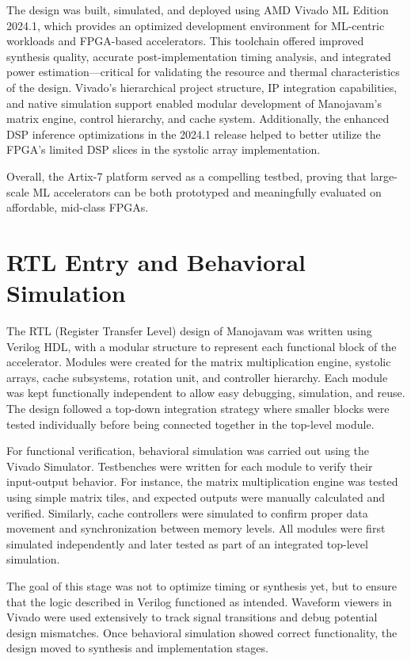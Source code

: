The design was built, simulated, and deployed using AMD Vivado ML Edition 2024.1, which provides an optimized development environment for ML-centric workloads and FPGA-based accelerators. This toolchain offered improved synthesis quality, accurate post-implementation timing analysis, and integrated power estimation—critical for validating the resource and thermal characteristics of the design. Vivado’s hierarchical project structure, IP integration capabilities, and native simulation support enabled modular development of Manojavam’s matrix engine, control hierarchy, and cache system. Additionally, the enhanced DSP inference optimizations in the 2024.1 release helped to better utilize the FPGA’s limited DSP slices in the systolic array implementation.

Overall, the Artix-7 platform served as a compelling testbed, proving that large-scale ML accelerators can be both prototyped and meaningfully evaluated on affordable, mid-class FPGAs.

\section{RTL Entry and Behavioral Simulation}
The RTL (Register Transfer Level) design of Manojavam was written using Verilog HDL, with a modular structure to represent each functional block of the accelerator. Modules were created for the matrix multiplication engine, systolic arrays, cache subsystems, rotation unit, and controller hierarchy. Each module was kept functionally independent to allow easy debugging, simulation, and reuse. The design followed a top-down integration strategy where smaller blocks were tested individually before being connected together in the top-level module.

For functional verification, behavioral simulation was carried out using the Vivado Simulator. Testbenches were written for each module to verify their input-output behavior. For instance, the matrix multiplication engine was tested using simple matrix tiles, and expected outputs were manually calculated and verified. Similarly, cache controllers were simulated to confirm proper data movement and synchronization between memory levels. All modules were first simulated independently and later tested as part of an integrated top-level simulation.

The goal of this stage was not to optimize timing or synthesis yet, but to ensure that the logic described in Verilog functioned as intended. Waveform viewers in Vivado were used extensively to track signal transitions and debug potential design mismatches. Once behavioral simulation showed correct functionality, the design moved to synthesis and implementation stages.

